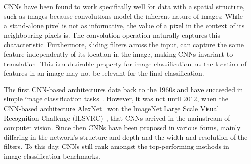 \documentclass[a4paper]{article}
\begin{document}
CNNs have been found to work specifically well for data with a spatial
structure, such as images because convolutions model the inherent nature of
images: While a stand-alone pixel is not as informative, the value of a pixel in
the context of its neighbouring pixels is. The convolution operation naturally
captures this characteristic. Furthermore, sliding filters across the input, can
capture the same feature independently of its location in the image, making CNNs
invariant to translation. This is a desirable property for image classification,
as the location of features in an image may not be relevant for the final
classification.

The first CNN-based architectures date back to the 1960s and have succeeded in
simple image classification tasks~\cite{lenet}. However, it was not until 2012,
when the CNN-based architecture AlexNet~\cite{alexnet} won the ImageNet Large
Scale Visual Recognition Challenge (ILSVRC)~\cite{imagenet}, that CNNs arrived
in the mainstream of computer vision. Since then CNNs have been proposed in
various forms, mainly differing in the network's structure and depth and the
width and resolution of the filters. To this day, CNNs still rank amongst the
top-performing methods in image classification benchmarks.

\end{document}
